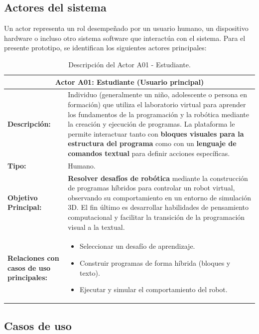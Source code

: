\subsection{Actores del sistema}
Un actor representa un rol desempeñado por un usuario humano, un dispositivo hardware o incluso otro sistema software que interactúa con el sistema. Para el presente prototipo, se identifican los siguientes actores principales:


\begin{table}[H] 
	\centering
	\begin{tabularx}{\linewidth}{|p{3cm}|X|} 
		\hline
		\multicolumn{2}{|c|}{\textbf{Actor A01: Estudiante (Usuario principal)}} \\
		\hline
		\textbf{Descripción:} & Individuo (generalmente un niño, adolescente o persona en formación) que utiliza el laboratorio virtual para aprender los fundamentos de la programación y la robótica mediante la creación y ejecución de programas. La plataforma le permite interactuar tanto con \textbf{bloques visuales para la estructura del programa} como con un \textbf{lenguaje de comandos textual} para definir acciones específicas. \\
		\hline
		\textbf{Tipo:} & Humano. \\
		\hline
		\textbf{Objetivo Principal:} & \textbf{Resolver desafíos de robótica} mediante la construcción de programas híbridos para controlar un robot virtual, observando su comportamiento en un entorno de simulación 3D. El fin último es desarrollar habilidades de pensamiento computacional y facilitar la transición de la programación visual a la textual. \\
		\hline
		\textbf{Relaciones con casos de uso principales:} & 
		\begin{itemize}
			\item Seleccionar un desafío de aprendizaje.
			\item Construir programas de forma híbrida (bloques y texto).
			\item Ejecutar y simular el comportamiento del robot.
		\end{itemize} \\
		\hline
	\end{tabularx}
	\caption{Descripción del Actor A01 - Estudiante.}
	\label{tabla:Actor_A01_Estudiante} 
\end{table}


\subsection{Casos de uso}


